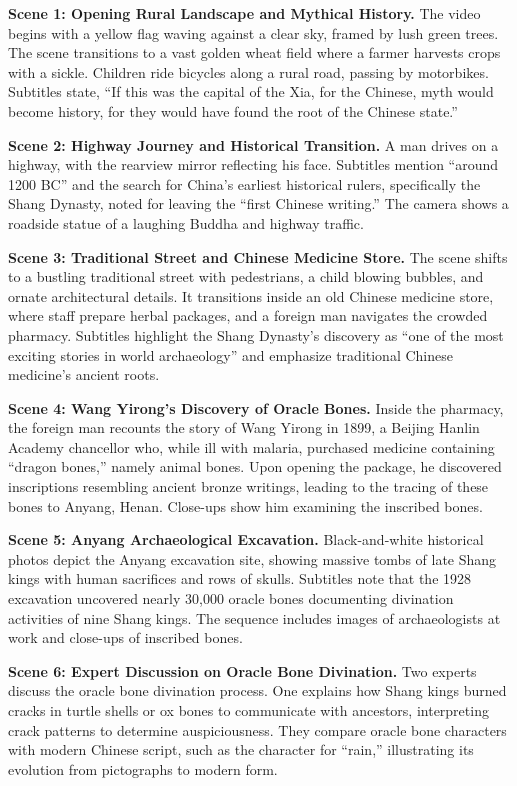 \documentclass{llmxive}
\begin{document}
\begin{caseresponse}
\textbf{Scene 1: Opening Rural Landscape and Mythical History.}
The video begins with a yellow flag waving against a clear sky, framed by lush green trees. The scene transitions to a vast golden wheat field where a farmer harvests crops with a sickle. Children ride bicycles along a rural road, passing by motorbikes. Subtitles state, ``If this was the capital of the Xia, for the Chinese, myth would become history, for they would have found the root of the Chinese state.''

\textbf{Scene 2: Highway Journey and Historical Transition.}
A man drives on a highway, with the rearview mirror reflecting his face. Subtitles mention ``around 1200 BC'' and the search for China's earliest historical rulers, specifically the Shang Dynasty, noted for leaving the ``first Chinese writing.'' The camera shows a roadside statue of a laughing Buddha and highway traffic.

\textbf{Scene 3: Traditional Street and Chinese Medicine Store.}
The scene shifts to a bustling traditional street with pedestrians, a child blowing bubbles, and ornate architectural details. It transitions inside an old Chinese medicine store, where staff prepare herbal packages, and a foreign man navigates the crowded pharmacy. Subtitles highlight the Shang Dynasty's discovery as ``one of the most exciting stories in world archaeology'' and emphasize traditional Chinese medicine's ancient roots.

\textbf{Scene 4: Wang Yirong's Discovery of Oracle Bones.}
Inside the pharmacy, the foreign man recounts the story of Wang Yirong in 1899, a Beijing Hanlin Academy chancellor who, while ill with malaria, purchased medicine containing ``dragon bones,'' namely animal bones. Upon opening the package, he discovered inscriptions resembling ancient bronze writings, leading to the tracing of these bones to Anyang, Henan. Close-ups show him examining the inscribed bones.

\textbf{Scene 5: Anyang Archaeological Excavation.}
Black-and-white historical photos depict the Anyang excavation site, showing massive tombs of late Shang kings with human sacrifices and rows of skulls. Subtitles note that the 1928 excavation uncovered nearly 30,000 oracle bones documenting divination activities of nine Shang kings. The sequence includes images of archaeologists at work and close-ups of inscribed bones.

\textbf{Scene 6: Expert Discussion on Oracle Bone Divination.}
Two experts discuss the oracle bone divination process. One explains how Shang kings burned cracks in turtle shells or ox bones to communicate with ancestors, interpreting crack patterns to determine auspiciousness. They compare oracle bone characters with modern Chinese script, such as the character for ``rain,'' illustrating its evolution from pictographs to modern form.


\end{caseresponse}
\end{document}
